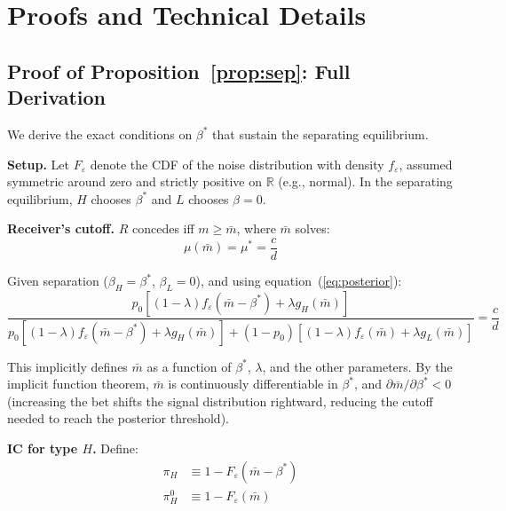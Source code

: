 \documentclass[12pt]{article}
\begin{document}
\newpage



\newpage
\appendix
\section{Proofs and Technical Details}\label{app:proofs}

\subsection{Proof of Proposition~\ref{prop:sep}: Full Derivation}

We derive the exact conditions on $\beta^*$ that sustain the separating equilibrium.

\textbf{Setup.} Let $F_\varepsilon$ denote the CDF of the noise distribution with density $f_\varepsilon$, assumed symmetric around zero and strictly positive on $\mathbb{R}$ (e.g., normal). In the separating equilibrium, $H$ chooses $\beta^*$ and $L$ chooses $\beta = 0$.

\textbf{Receiver's cutoff.} $R$ concedes iff $m \geq \bar{m}$, where $\bar{m}$ solves:
\begin{equation}
\mu(\bar{m}) = \mu^* = \frac{c}{d}
\end{equation}

Given separation ($\beta_H = \beta^*$, $\beta_L = 0$), and using equation~(\ref{eq:posterior}):
\begin{equation}
\frac{p_0\left[(1-\lambda)f_\varepsilon(\bar{m} - \beta^*) + \lambda g_H(\bar{m})\right]}{p_0\left[(1-\lambda)f_\varepsilon(\bar{m} - \beta^*) + \lambda g_H(\bar{m})\right] + (1-p_0)\left[(1-\lambda)f_\varepsilon(\bar{m}) + \lambda g_L(\bar{m})\right]} = \frac{c}{d}
\end{equation}

This implicitly defines $\bar{m}$ as a function of $\beta^*$, $\lambda$, and the other parameters. By the implicit function theorem, $\bar{m}$ is continuously differentiable in $\beta^*$, and $\partial \bar{m}/\partial \beta^* < 0$ (increasing the bet shifts the signal distribution rightward, reducing the cutoff needed to reach the posterior threshold).

\textbf{IC for type $H$.} Define:
\begin{align}
\pi_H &\equiv 1 - F_\varepsilon(\bar{m} - \beta^*) \\
\pi_H^0 &\equiv 1 - F_\varepsilon(\bar{m})
\end{align}
\end{document}
